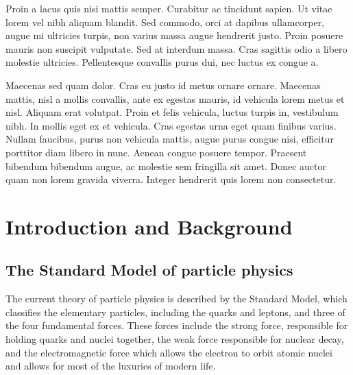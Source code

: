 \documentclass[11pt, oneside]{article}
\begin{document}
Proin a lacus quis nisi mattis semper. Curabitur ac tincidunt sapien. Ut vitae lorem vel nibh aliquam blandit. Sed commodo, orci at dapibus ullamcorper, augue mi ultricies turpis, non varius massa augue hendrerit justo. Proin posuere mauris non suscipit vulputate. Sed at interdum massa. Cras sagittis odio a libero molestie ultricies. Pellentesque convallis purus dui, nec luctus ex congue a.

Maecenas sed quam dolor. Cras eu justo id metus ornare ornare. Maecenas mattis, nisl a mollis convallis, ante ex egestas mauris, id vehicula lorem metus et nisl. Aliquam erat volutpat. Proin et felis vehicula, luctus turpis in, vestibulum nibh. In mollis eget ex et vehicula. Cras egestas urna eget quam finibus varius. Nullam faucibus, purus non vehicula mattis, augue purus congue nisi, efficitur porttitor diam libero in nunc. Aenean congue posuere tempor. Praesent bibendum bibendum augue, ac molestie sem fringilla sit amet. Donec auctor quam non lorem gravida viverra. Integer hendrerit quis lorem non consectetur. 
\newpage
\clearpage
\tableofcontents

\clearpage
\listoffigures

\clearpage
\listoftables

\clearpage
{}
\section{Introduction and Background}
\subsection{The Standard Model of particle physics}
The current theory of particle physics is described by the Standard Model, which classifies the elementary particles, including the quarks and leptons, and three of the four fundamental forces.
These forces include the strong force, responsible for holding quarks and nuclei together, the weak force responsible for nuclear decay, and the electromagnetic force which allows the electron to orbit atomic nuclei and allows for most of the luxuries of modern life.
\end{document}

